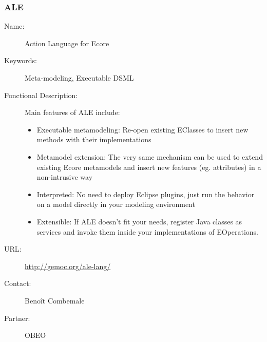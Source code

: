 \subsubsection{ALE}
\label{bil-3337}
\begin{description}
\item[Name:] Action Language for Ecore
\item[Keywords:] Meta-modeling, Executable DSML


\item[Functional Description:]
Main features of ALE include:

\begin{itemize}
\item Executable metamodeling: Re-open existing EClasses to insert new methods with their implementations
\item Metamodel extension: The very same mechanism can be used to extend existing Ecore metamodels and insert new features (eg. attributes) in a non-intrusive way
\item Interpreted: No need to deploy Eclipse plugins, just run the behavior on a model directly in your modeling environment
\item Extensible: If ALE doesn’t fit your needs, register Java classes as services and invoke them inside your implementations of EOperations.
\end{itemize}




\item[URL:] \url{http://gemoc.org/ale-lang/}
\item[Contact:] Benoît Combemale
\item[Partner:] OBEO
\end{description}


